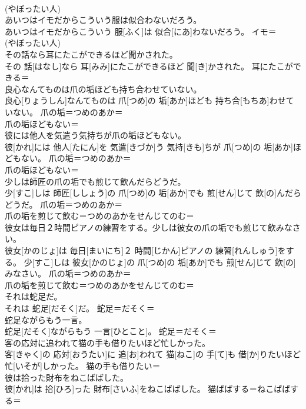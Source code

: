 \documentclass[8pt]{extreport}
\begin{document}
\begin{CJK}{UTF8}{min}
{\\	(やぼったい人) 
\\	あいつはイモだからこういう服は似合わないだろう。	
\\	あいつはイモだからこういう 服[ふく]は 似合[にあ]わないだろう。	イモ＝ 
\\	(やぼったい人) 
\\	その話なら耳にたこができるほど聞かされた。	
\\	その 話[はなし]なら 耳[みみ]にたこができるほど 聞[き]かされた。	耳にたこができる＝ 
\\	良心なんてものは爪の垢ほども持ち合わせていない。	
\\	良心[りょうしん]なんてものは 爪[つめ]の 垢[あか]ほども 持ち合[もちあ]わせていない。	爪の垢＝つめのあか＝ 
\\	爪の垢ほどもない＝ 
\\	彼には他人を気遣う気持ちが爪の垢ほどもない。	
\\	彼[かれ]には 他人[たにん]を 気遣[きづか]う 気持[きも]ちが 爪[つめ]の 垢[あか]ほどもない。	爪の垢＝つめのあか＝ 
\\	爪の垢ほどもない＝ 
\\	少しは師匠の爪の垢でも煎じて飲んだらどうだ。	
\\	少[すこ]しは 師匠[ししょう]の 爪[つめ]の 垢[あか]でも 煎[せん]じて 飲[の]んだらどうだ。	爪の垢＝つめのあか＝ 
\\	爪の垢を煎じて飲む＝つめのあかをせんじてのむ＝ 
\\	彼女は毎日２時間ピアノの練習をする。少しは彼女の爪の垢でも煎じて飲みなさい。	
\\	彼女[かのじょ]は 毎日[まいにち]２ 時間[じかん]ピアノの 練習[れんしゅう]をする。 少[すこ]しは 彼女[かのじょ]の 爪[つめ]の 垢[あか]でも 煎[せん]じて 飲[の]みなさい。	爪の垢＝つめのあか＝ 
\\	爪の垢を煎じて飲む＝つめのあかをせんじてのむ＝ 
\\	それは蛇足だ。	
\\	それは 蛇足[だそく]だ。	蛇足＝だそく＝ 
\\	蛇足ながらもう一言。	
\\	蛇足[だそく]ながらもう 一言[ひとこと]。	蛇足＝だそく＝ 
\\	客の応対に追われて猫の手も借りたいほど忙しかった。	
\\	客[きゃく]の 応対[おうたい]に 追[お]われて 猫[ねこ]の 手[て]も 借[か]りたいほど 忙[いそが]しかった。	猫の手も借りたい＝ 
\\	彼は拾った財布をねこばばした。	
\\	彼[かれ]は 拾[ひろ]った 財布[さいふ]をねこばばした。	猫ばばする＝ねこばばする＝ 
}
\end{CJK}
\end{document}
